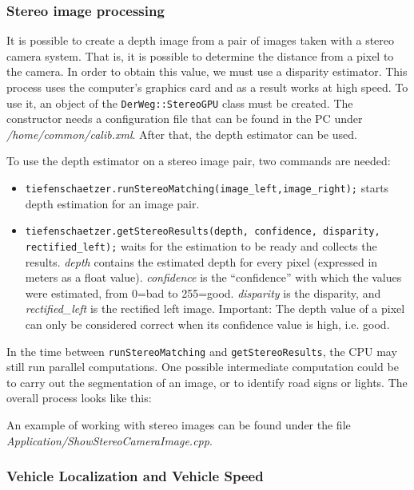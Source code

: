 \documentclass[a4paper, 11pt]{article}
\newcommand{\codeex}[2][0.98\textwidth]{\vspace*{1ex}\noindent\fbox{\parbox{#1}{}}\vspace*{1ex}}
\begin{document}
\subsubsection{Stereo image processing}
\label{sec:stereo}

It is possible to create a depth image from a pair of images taken with a stereo camera system. That is, it is possible to determine the distance from a pixel to the camera. In order to obtain this value, we must use a disparity estimator. This process uses the computer’s graphics card and as a result works at high speed. To use it, an object of the \texttt{DerWeg::StereoGPU} class must be created. The constructor needs a configuration file that can be found in the PC under \textit{/home/common/calib.xml}. After that, the depth estimator can be used.

To use the depth estimator on a stereo image pair, two commands are needed:
\begin{itemize}
\item \texttt{tiefenschaetzer.runStereoMatching(image\_left,image\_right);} starts depth estimation for an image pair.
\item \texttt{tiefenschaetzer.getStereoResults(depth, confidence, disparity, rectified\_left);} waits for the estimation to be ready and collects the results. \textit{depth} contains the estimated depth for every pixel (expressed in meters as a float value). \textit{confidence} is the “confidence” with which the values were estimated, from 0=bad to 255=good. \textit{disparity} is the disparity, and \textit{rectified\_left} is the rectified left image. Important: The depth value of a pixel can only be considered correct when its confidence value is high, i.e. good. 
\end{itemize}

In the time between \texttt{runStereoMatching} and \texttt{getStereoResults}, the CPU may still run parallel computations. One possible intermediate computation could be to carry out the segmentation of an image, or to identify road signs or lights. The overall process looks like this:
\codeex[0.9\textwidth]{beispielStereo.cpp}

An example of working with stereo images can be found under the file \textit{Application/ShowStereoCameraImage.cpp}.

\subsubsection{Vehicle Localization and Vehicle Speed}
\end{document}
